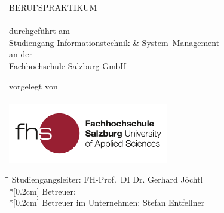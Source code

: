 \begin{titlepage}


\hspace{7cm}

\begin{center}
	{\Large\uppercase\expandafter{ BERUFSPRAKTIKUM}}\\[0.5ex]
	\vspace{1cm}
	\Large{\bf\large \Title}\\
	\vspace{1.5cm}
	\normalsize durchgeführt am\\
	Studiengang Informationstechnik \& System--Management\\
	an der\\
	Fachhochschule Salzburg GmbH\\
\end{center}

\vspace{2cm}

\begin{center}
	\normalsize vorgelegt von
	\\
	{
		\Large{\bf\large \Author}\\
	}
	\vspace{2cm}
	\includegraphics[width=7cm]{BilderAllgemein/Logo.jpg}\medskip
\end{center}
	
\vspace{1.5cm}

\begin{tabbing}
	\hspace*{2cm}\=\hspace*{5.5cm}\= \kill
	\> Studiengangsleiter: \> FH-Prof.~DI Dr. Gerhard Jöchtl \\*[0.2cm]
	\> Betreuer: \> \Advisor\\*[0.2cm]
	\> Betreuer im Unternehmen: \>Stefan Entfellner
\end{tabbing}

\vfill	

\begin{center}
\VenueMonthYear\\
\end{center}
\end{titlepage}